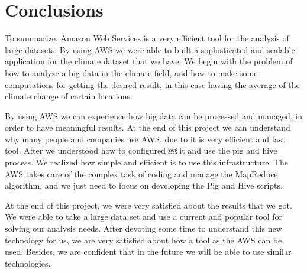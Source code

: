 
\label{sec:conclusions}
\section{Conclusions}
To summarize, Amazon Web Services is a very efficient tool for the analysis of large datasets. By using AWS we were able to built a sophisticated and scalable application for the climate dataset that we have. We begin with the problem of how to analyze a big data in the climate field, and how to make some computations for getting the desired result, in this case having the average of the climate change of certain locations.

By using AWS we can experience how big data can be processed and managed, in order to have meaningful results. At the end of this project we can understand why many people and companies use AWS, due to it is very efficient and fast tool. After we understood how to configured ￼ it and use the pig and hive process. We realized how simple and efficient is to use this infrastructure. The AWS takes care of the complex task of coding and manage the MapReduce algorithm, and we just need to focus on developing the Pig and Hive scripts.

At the end of this project, we were very satisfied about the results that we got. We were able to take a large data set and use a current and popular tool for solving our analysis needs. After devoting some time to understand this new technology for us, we are very satisfied about how a tool as the AWS can be used. Besides, we are confident that in the future we will be able to use similar technologies.



